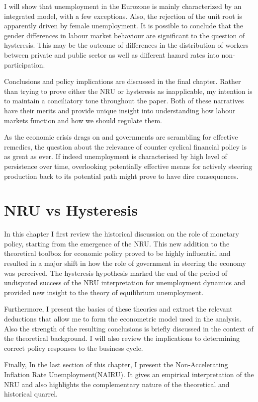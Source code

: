 \documentclass[12pt,a4paper,english]{article}
\begin{document}
I will show that unemployment in the Eurozone is mainly characterized by an integrated model, with a few exceptions. Also, the rejection of the unit root is apparently driven by female unemployment. It is possible to conclude that the gender differences in labour market behaviour are significant to the question of hysteresis. This may be the outcome of differences in the distribution of workers between private and public sector as well as different hazard rates into non-participation.

Conclusions and policy implications are discussed in the final chapter.  Rather than trying to prove either the NRU or hysteresis as inapplicable, my intention is to maintain a conciliatory tone throughout the paper. Both of these narratives have their merits and provide unique insight into understanding how labour markets function and how we should regulate them. 

As the economic crisis drags on and governments are scrambling for effective remedies, the question about the relevance of counter cyclical financial policy is as great as ever. If indeed unemployment is characterised by high level of persistence over time, overlooking potentially effective means for actively steering production back to its potential path might prove to have dire consequences.


\clearpage
\section{NRU vs Hysteresis}
In this chapter I first review the historical discussion on the role of monetary policy, starting from the emergence of the NRU. This new addition to the theoretical toolbox for economic policy proved to be highly influential and resulted in a major shift in how the role of government in steering the economy was perceived. The hysteresis hypothesis marked the end of the period of undisputed success of the NRU interpretation for unemployment dynamics and provided new insight to the theory of equilibrium unemployment.

Furthermore, I present the basics of these theories and extract the relevant deductions that allow me to form the econometric model used in the analysis. Also the strength of the resulting conclusions is briefly discussed in the context of the theoretical background. I will also review the implications to determining correct policy responses to the business cycle.

Finally, In the last section of this chapter, I present the Non-Accelerating Inflation Rate Unemployment(NAIRU). It gives an empirical interpretation of the NRU and also highlights the complementary nature of the theoretical and historical quarrel.
\end{document}

